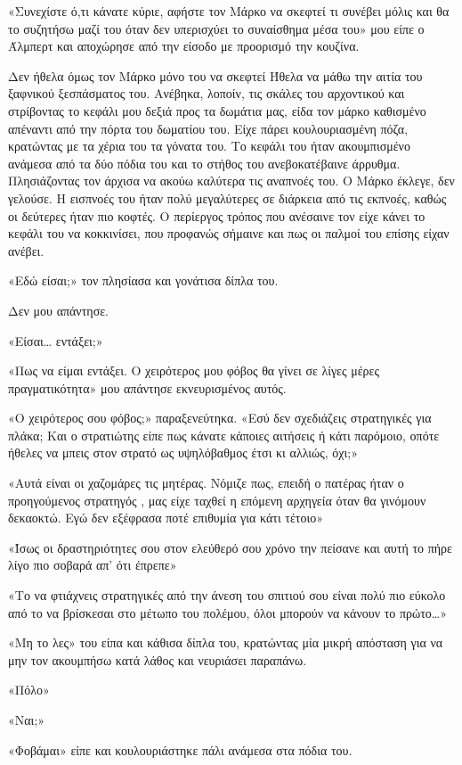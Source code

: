 \documentclass[12pt,twoside, openany]{book}
\begin{document}
«Συνεχίστε ό,τι κάνατε κύριε, αφήστε τον Μάρκο να σκεφτεί τι συνέβει μόλις και θα το συζητήσω μαζί του όταν δεν υπερισχύει το συναίσθημα μέσα του» μου είπε ο Άλμπερτ και αποχώρησε από την είσοδο με προορισμό την κουζίνα.

Δεν ήθελα όμως τον Μάρκο μόνο του να σκεφτεί Ήθελα να μάθω την αιτία του ξαφνικού ξεσπάσματος του. Ανέβηκα, λοποίν, τις σκάλες του αρχοντικού και στρίβοντας το κεφάλι μου δεξιά προς τα δωμάτια μας, είδα τον μάρκο καθισμένο απέναντι από την πόρτα του δωματίου του. Είχε πάρει κουλουριασμένη πόζα, κρατώντας με τα χέρια του τα γόνατα του. Το κεφάλι του ήταν ακουμπισμένο ανάμεσα από τα δύο πόδια του και το στήθος του ανεβοκατέβαινε άρρυθμα. Πλησιάζοντας τον άρχισα να ακούω καλύτερα τις αναπνοές του. Ο Μάρκο έκλεγε, δεν γελούσε. Η εισπνοές του ήταν πολύ μεγαλύτερες σε διάρκεια από τις εκπνοές, καθώς οι δεύτερες ήταν πιο κοφτές. Ο περίεργος τρόπος που ανέσαινε τον είχε κάνει το κεφάλι του να κοκκινίσει, που προφανώς σήμαινε και πως οι παλμοί του επίσης είχαν ανέβει.

«Εδώ είσαι;» τον πλησίασα και γονάτισα δίπλα του.

Δεν μου απάντησε.

«Είσαι… εντάξει;»

«Πως να είμαι εντάξει. Ο χειρότερος μου φόβος θα γίνει σε λίγες μέρες πραγματικότητα» μου απάντησε εκνευρισμένος αυτός.

«Ο χειρότερος σου φόβος;» παραξενεύτηκα. «Εσύ δεν σχεδιάζεις στρατηγικές για πλάκα; Και ο στρατιώτης είπε πως κάνατε κάποιες αιτήσεις ή κάτι παρόμοιο, οπότε ήθελες να μπεις στον στρατό ως υψηλόβαθμος έτσι κι αλλιώς, όχι;»

«Αυτά είναι οι χαζομάρες τις μητέρας. Νόμιζε πως, επειδή ο πατέρας ήταν ο προηγούμενος στρατηγός , μας είχε ταχθεί η επόμενη αρχηγεία όταν θα γινόμουν δεκαοκτώ. Εγώ δεν εξέφρασα ποτέ επιθυμία για κάτι τέτοιο»

«Ίσως οι δραστηριότητες σου στον ελεύθερό σου χρόνο την πείσανε και αυτή το πήρε λίγο πιο σοβαρά απ’ ότι έπρεπε»

«Το να φτιάχνεις στρατηγικές από την άνεση του σπιτιού σου είναι πολύ πιο εύκολο από το να βρίσκεσαι στο μέτωπο του πολέμου, όλοι μπορούν να κάνουν το πρώτο…»

«Μη το λες» του είπα και κάθισα δίπλα του, κρατώντας μία μικρή απόσταση για να μην τον ακουμπήσω κατά λάθος και νευριάσει παραπάνω.

«Πόλο»

«Ναι;»

«Φοβάμαι» είπε και κουλουριάστηκε πάλι ανάμεσα στα πόδια του.
\end{document}
